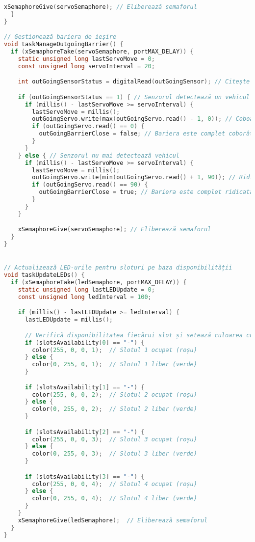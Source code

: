 \documentclass[a4paper,11pt]{report}
\begin{document}
\begin{lstlisting}[language=C]
    xSemaphoreGive(servoSemaphore); // Eliberează semaforul
  }
}

// Gestionează bariera de ieșire
void taskManageOutgoingBarrier() {
  if (xSemaphoreTake(servoSemaphore, portMAX_DELAY)) {
    static unsigned long lastServoMove = 0;
    const unsigned long servoInterval = 20;

    int outGoingSensorStatus = digitalRead(outGoingSensor); // Citește statusul senzorului de ieșire

    if (outGoingSensorStatus == 1) { // Senzorul detectează un vehicul
      if (millis() - lastServoMove >= servoInterval) {
        lastServoMove = millis();
        outGoingServo.write(max(outGoingServo.read() - 1, 0)); // Coboară bariera
        if (outGoingServo.read() == 0) {
          outGoingBarrierClose = false; // Bariera este complet coborâtă
        }
      }
    } else { // Senzorul nu mai detectează vehicul
      if (millis() - lastServoMove >= servoInterval) {
        lastServoMove = millis();
        outGoingServo.write(min(outGoingServo.read() + 1, 90)); // Ridică bariera
        if (outGoingServo.read() == 90) {
          outGoingBarrierClose = true; // Bariera este complet ridicată
        }
      }
    }

    xSemaphoreGive(servoSemaphore); // Eliberează semaforul
  }
}


// Actualizează LED-urile pentru sloturi pe baza disponibilității
void taskUpdateLEDs() {
  if (xSemaphoreTake(ledSemaphore, portMAX_DELAY)) {
    static unsigned long lastLEDUpdate = 0;
    const unsigned long ledInterval = 100;

    if (millis() - lastLEDUpdate >= ledInterval) {
      lastLEDUpdate = millis();

      // Verifică disponibilitatea fiecărui slot și setează culoarea corespunzătoare a LED-urilor
      if (slotsAvailability[0] == "-") {
        color(255, 0, 0, 1);  // Slotul 1 ocupat (roșu)
      } else {
        color(0, 255, 0, 1);  // Slotul 1 liber (verde)
      }

      if (slotsAvailability[1] == "-") {
        color(255, 0, 0, 2);  // Slotul 2 ocupat (roșu)
      } else {
        color(0, 255, 0, 2);  // Slotul 2 liber (verde)
      }

      if (slotsAvailability[2] == "-") {
        color(255, 0, 0, 3);  // Slotul 3 ocupat (roșu)
      } else {
        color(0, 255, 0, 3);  // Slotul 3 liber (verde)
      }

      if (slotsAvailability[3] == "-") {
        color(255, 0, 0, 4);  // Slotul 4 ocupat (roșu)
      } else {
        color(0, 255, 0, 4);  // Slotul 4 liber (verde)
      }
    }
    xSemaphoreGive(ledSemaphore);  // Eliberează semaforul
  }
}


\end{lstlisting}
\end{document}
